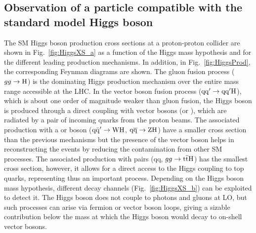 %

\subsection{Observation of a particle compatible with the standard model Higgs boson}\label{subsec:HiggsLHC}

The SM Higgs boson production cross sections at a proton-proton collider are shown in Fig.~\ref{fig:HiggsXS_a} as a function of the Higgs mass hypothesis and for the different leading production mechanisms.
In addition, in Fig.~\ref{fig:HiggsProd}, the corresponding Feynman diagrams are shown.
The gluon fusion process ($gg \to \mathrm{H}$) is the dominating Higgs production mechanism over the entire mass range accessible at the LHC.
In the vector boson fusion process  ($\mathrm{qq}^\prime \to \mathrm{qq}^\prime \mathrm{H}$), which is about one order of magnitude weaker than gluon fusion, the Higgs boson is produced through a direct coupling with vector bosons (\PW or \PZ), which are radiated by a pair of incoming quarks from the proton beams. 
The associated production with a \PW or \PZ boson ($\mathrm{q\bar{q}}^\prime \to \mathrm{W}\mathrm{H}$, $\mathrm{q}\overline{\mathrm{q}} \to \mathrm{Z}\mathrm{H}$) have a smaller cross section than the previous mechanisms but the presence of the vector boson helps in reconstructing the events by reducing the contamination from other SM processes.
The associated production with \ttbar pairs (qq, $gg \to \mathrm{t}\overline{\mathrm{t}}\mathrm{H}$) has the smallest cross section, however, it allows for a direct access to the Higgs coupling to top quarks, representing thus an important process.
Depending on the Higgs boson mass hypothesis, different decay channels (Fig.~\ref{fig:HiggsXS_b}) can be exploited to detect it.
The Higgs boson does not couple to photons and gluons at LO, but such processes can arise via fermion or vector boson loops, giving a sizable contribution
below the mass at which the Higgs boson would decay to on-shell vector bosons.\\


